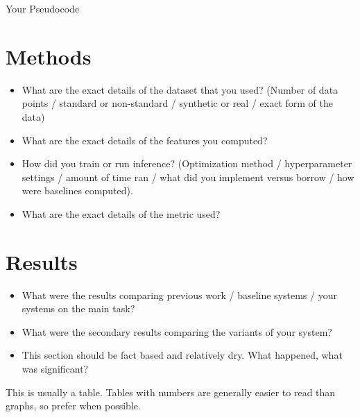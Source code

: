 \documentclass{article}
\begin{document}
\begin{algorithm}
  \begin{algorithmic}
    \STATE{}
  \end{algorithmic}
  \caption{Your Pseudocode}
\end{algorithm}




\section{Methods}

\begin{itemize}
\item What are the exact details of the dataset that you used? (Number of data points / standard or non-standard / synthetic or real / exact form of the data)

\item What are the exact details of the features you computed?


\item How did you train or run inference? (Optimization method / hyperparameter settings / amount of time ran / what did you implement versus borrow / how were baselines computed).

\item What are the exact details of the metric used?
\end{itemize}



\section{Results}

\begin{itemize}
\item What were the results comparing previous work / baseline systems / your systems on the main task?
\item What were the secondary results comparing the variants of your system?
\item This section should be fact based and relatively dry. What happened, what was significant?
\end{itemize}

\begin{table*}
  \centering
  \missingfigure{}
  \caption{This is usually a table. Tables with numbers are generally easier to read than graphs, so prefer when possible.}
  \label{fig:mainres}
\end{table*}
\end{document}
